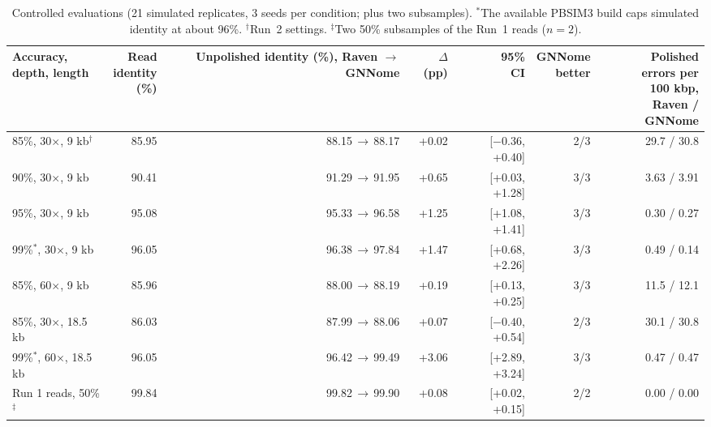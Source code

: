 \documentclass[a4paper]{llncs}
\renewcommand{\arraystretch}{1.0}
\begin{document}
\begin{table}[!htbp]
\centering
\scriptsize
\setlength{\tabcolsep}{1pt}
\renewcommand{\arraystretch}{1.15}
\begin{tabular*}{\textwidth}{@{\extracolsep{\fill}}lrrrrrr}
\toprule
\shortstack[l]{Accuracy,\\depth, length} & \shortstack[r]{Read\\identity\\(\%)} & \shortstack[r]{Unpolished\\identity (\%),\\Raven\\$\rightarrow$ GNNome} & \shortstack[r]{$\Delta$\\(pp)} & \shortstack[r]{95\%\\CI} & \shortstack[r]{GNNome\\better} & \shortstack[r]{Polished\\errors per\\100 kbp,\\Raven / GNNome} \\
\midrule
85\%, 30$\times$, 9 kb$^{\dagger}$ & 85.95 & 88.15$\,\rightarrow\,$88.17 & +0.02 & [$-0.36$, +0.40] & 2/3 & 29.7 / 30.8 \\
90\%, 30$\times$, 9 kb & 90.41 & 91.29$\,\rightarrow\,$91.95 & +0.65 & [+0.03, +1.28] & 3/3 & 3.63 / 3.91 \\
95\%, 30$\times$, 9 kb & 95.08 & 95.33$\,\rightarrow\,$96.58 & +1.25 & [+1.08, +1.41] & 3/3 & 0.30 / 0.27 \\
99\%$^{*}$, 30$\times$, 9 kb & 96.05 & 96.38$\,\rightarrow\,$97.84 & +1.47 & [+0.68, +2.26] & 3/3 & 0.49 / 0.14 \\
85\%, 60$\times$, 9 kb & 85.96 & 88.00$\,\rightarrow\,$88.19 & +0.19 & [+0.13, +0.25] & 3/3 & 11.5 / 12.1 \\
85\%, 30$\times$, 18.5 kb & 86.03 & 87.99$\,\rightarrow\,$88.06 & +0.07 & [$-0.40$, +0.54] & 2/3 & 30.1 / 30.8 \\
99\%$^{*}$, 60$\times$, 18.5 kb & 96.05 & 96.42$\,\rightarrow\,$99.49 & +3.06 & [+2.89, +3.24] & 3/3 & 0.47 / 0.47 \\
Run 1 reads, 50\%$^{\ddagger}$ & 99.84 & 99.82$\,\rightarrow\,$99.90 & +0.08 & [+0.02, +0.15] & 2/2 & 0.00 / 0.00 \\
\bottomrule
\end{tabular*}
\caption{Controlled evaluations (21 simulated replicates, 3 seeds per condition; plus two subsamples). $^{*}$The available PBSIM3 build caps simulated identity at about 96\%. $^{\dagger}$Run~2 settings. $^{\ddagger}$Two 50\% subsamples of the Run~1 reads ($n=2$).}
\label{tab:replicates}
\end{table}
\end{document}
